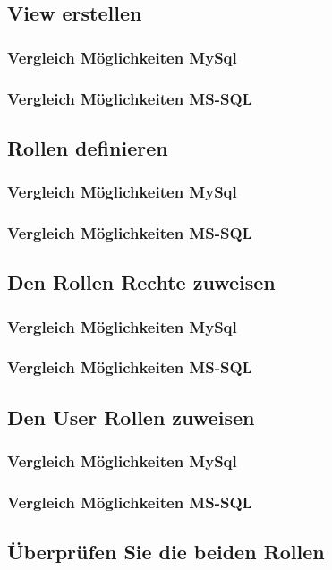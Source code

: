 \documentclass[11pt,a4paper,parskip=half]{scrartcl}
\begin{document}
\subsection{View erstellen}
\subsubsection{Vergleich Möglichkeiten MySql}
\subsubsection{Vergleich Möglichkeiten MS-SQL}

\subsection{Rollen definieren}
\subsubsection{Vergleich Möglichkeiten MySql}
\subsubsection{Vergleich Möglichkeiten MS-SQL}

\subsection{Den Rollen Rechte zuweisen}
\subsubsection{Vergleich Möglichkeiten MySql}
\subsubsection{Vergleich Möglichkeiten MS-SQL}

\subsection{Den User Rollen zuweisen}
\subsubsection{Vergleich Möglichkeiten MySql}
\subsubsection{Vergleich Möglichkeiten MS-SQL}

\subsection{Überprüfen Sie die beiden Rollen}
\end{document}
